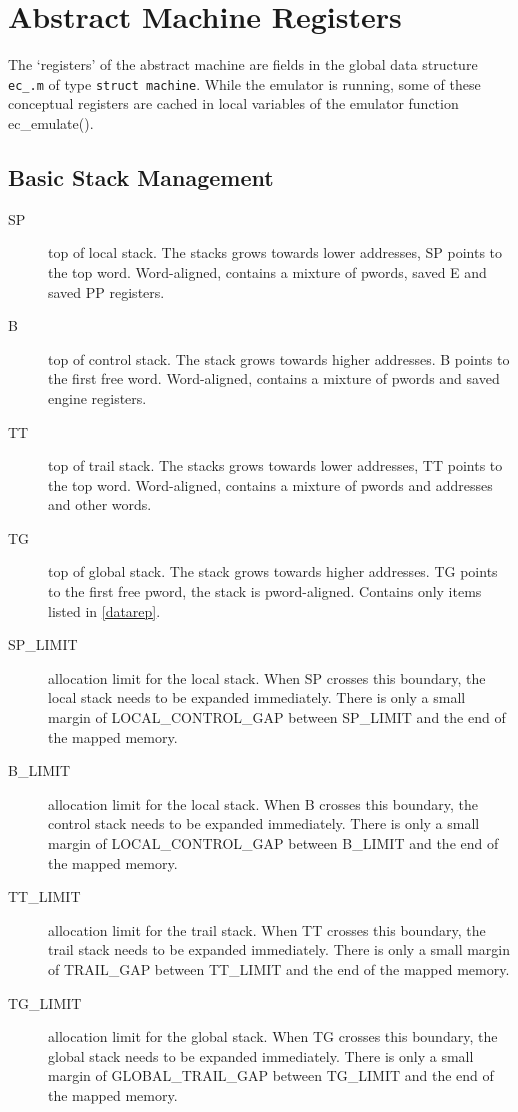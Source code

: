 \section{Abstract Machine Registers}

The `registers' of the abstract machine are fields in the global
data structure {\tt ec_.m} of type {\tt struct machine}.
While the emulator is running, some of these conceptual registers
are cached in local variables of the emulator function ec_emulate().

\subsection{Basic Stack Management}
\begin{description}
\item[SP] top of local stack. The stacks grows towards lower addresses,
        SP points to the top word. Word-aligned, contains a mixture
        of pwords, saved E and saved PP registers.
\item[B] top of control stack. The stack grows towards higher addresses.
        B points to the first free word. Word-aligned, contains a mixture
        of pwords and saved engine registers.
\item[TT] top of trail stack. The stacks grows towards lower addresses,
        TT points to the top word. Word-aligned, contains a mixture
        of pwords and addresses and other words.
\item[TG] top of global stack. The stack grows towards higher addresses.
        TG points to the first free pword, the stack is pword-aligned.
        Contains only items listed in \ref{datarep}.
\item[SP_LIMIT] allocation limit for the local stack. When SP crosses this
        boundary, the local stack needs to be expanded immediately.
        There is only a small margin of LOCAL_CONTROL_GAP between SP_LIMIT
        and the end of the mapped memory.
\item[B_LIMIT] allocation limit for the local stack. When B crosses this
        boundary, the control stack needs to be expanded immediately.
        There is only a small margin of LOCAL_CONTROL_GAP between B_LIMIT
        and the end of the mapped memory.
\item[TT_LIMIT] allocation limit for the trail stack. When TT crosses this
        boundary, the trail stack needs to be expanded immediately.
        There is only a small margin of TRAIL_GAP between TT_LIMIT
        and the end of the mapped memory.
\item[TG_LIMIT] allocation limit for the global stack. When TG crosses this
        boundary, the global stack needs to be expanded immediately.
        There is only a small margin of GLOBAL_TRAIL_GAP between TG_LIMIT
        and the end of the mapped memory.
\end{description}


